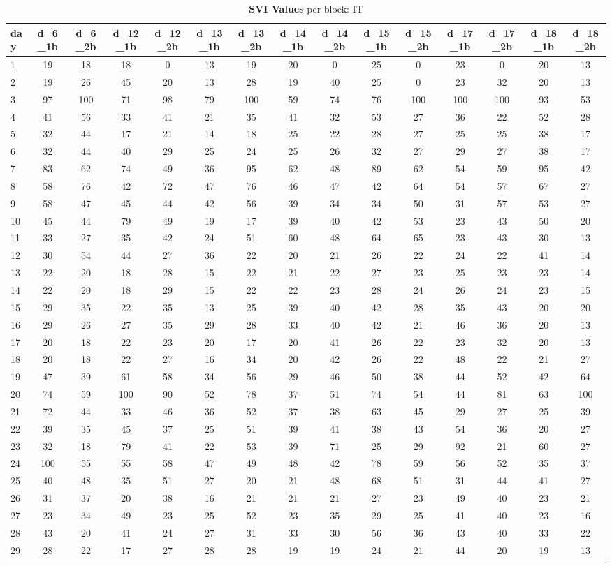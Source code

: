 \documentclass[a4paper,12pt]{article}
\begin{document}
\begin{landscape}
\begin{footnotesize}
\begin{center}
\begin{longtable}{lcccccccccccccc}
\caption{\textbf{SVI Values} per block: IT\label{tab_it_1}}
\hline
day&d\_6\_1b&d\_6\_2b&d\_12\_1b&d\_12\_2b&d\_13\_1b&d\_13\_2b&d\_14\_1b&d\_14\_2b&d\_15\_1b&d\_15\_2b&d\_17\_1b&d\_17\_2b&d\_18\_1b&d\_18\_2b \\ \hline
1&19&18&18&0&13&19&20&0&25&0&23&0&20&13 \\
2&19&26&45&20&13&28&19&40&25&0&23&32&20&13 \\
3&97&100&71&98&79&100&59&74&76&100&100&100&93&53 \\
4&41&56&33&41&21&35&41&32&53&27&36&22&52&28 \\
5&32&44&17&21&14&18&25&22&28&27&25&25&38&17 \\
6&32&44&40&29&25&24&25&26&32&27&29&27&38&17 \\
7&83&62&74&49&36&95&62&48&89&62&54&59&95&42 \\
8&58&76&42&72&47&76&46&47&42&64&54&57&67&27 \\
9&58&47&45&44&42&56&39&34&34&50&31&57&53&27 \\
10&45&44&79&49&19&17&39&40&42&53&23&43&50&20 \\
11&33&27&35&42&24&51&60&48&64&65&23&43&30&13 \\
12&30&54&44&27&36&22&20&21&26&22&24&22&41&14 \\
13&22&20&18&28&15&22&21&22&27&23&25&23&23&14 \\
14&22&20&18&29&15&22&22&23&28&24&26&24&23&15 \\
15&29&35&22&35&13&25&39&40&42&28&35&43&20&20 \\
16&29&26&27&35&29&28&33&40&42&21&46&36&20&13 \\
17&20&18&22&23&20&17&20&41&26&22&23&32&20&13 \\
18&20&18&22&27&16&34&20&42&26&22&48&22&21&27 \\
19&47&39&61&58&34&56&29&46&50&38&44&52&42&64 \\
20&74&59&100&90&52&78&37&51&74&54&44&81&63&100 \\
21&72&44&33&46&36&52&37&38&63&45&29&27&25&39 \\
22&39&35&45&37&25&51&39&41&38&43&54&36&20&27 \\
23&32&18&79&41&22&53&39&71&25&29&92&21&60&27 \\
24&100&55&55&58&47&49&48&42&78&59&56&52&35&37 \\
25&40&48&35&51&27&20&21&48&68&51&31&44&41&27 \\
26&31&37&20&38&16&21&21&21&27&23&49&40&23&21 \\
27&23&34&49&23&25&52&23&35&29&25&41&40&23&16 \\
28&43&20&41&24&27&31&33&30&56&36&43&40&33&22 \\
29&28&22&17&27&28&28&19&19&24&21&44&20&19&13 \\ \hline
\end{longtable}
\end{center}
\end{footnotesize}
\end{landscape}
\end{document}
